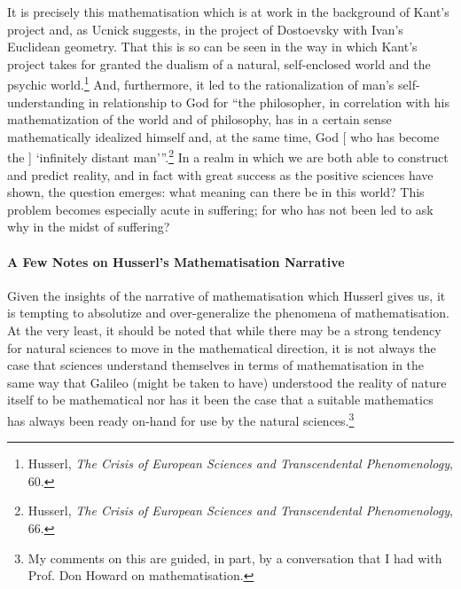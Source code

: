 \documentclass[12pt]{article}
\begin{document}
	 It is precisely this mathematisation which is at work in the background of Kant's project and, as Ucnick suggests, in the project of Dostoevsky with Ivan's Euclidean geometry. That this is so can be seen in the way in which Kant's project takes for granted the dualism of a natural, self-enclosed world and the psychic world.\footnote{Husserl, \emph{The Crisis of European Sciences and Transcendental Phenomenology}, 60.} And, furthermore, it led to the rationalization of man's self-understanding in relationship to God for ``the philosopher, in correlation with his mathematization of the world and of philosophy, has in a certain sense mathematically idealized himself and, at the same time, God [ who has become the ] `infinitely distant man'\thinspace''.\footnote{Husserl, \emph{The Crisis of European Sciences and Transcendental Phenomenology}, 66.} In a realm in which we are both able to construct and predict reality, and in fact with great success as the positive sciences have shown, the question emerges: what meaning can there be in this world? This problem becomes especially acute in suffering; for who has not been led to ask why in the midst of suffering?
	 
	 \paragraph*{A Few Notes on Husserl's Mathematisation Narrative}
	 
	 Given the insights of the narrative of mathematisation which Husserl gives us, it is tempting to absolutize and over-generalize the phenomena of mathematisation. At the very least, it should be noted that while there may be a strong tendency for natural sciences to move in the mathematical direction, it is not always the case that sciences understand themselves in terms of mathematisation in the same way that Galileo (might be taken to have) understood the reality of nature itself to be mathematical nor has it been the case that a suitable mathematics has always been ready on-hand for use by the natural sciences.\footnote{My comments on this are guided, in part, by a conversation that I had with Prof. Don Howard on mathematisation.}
	 
\end{document}
